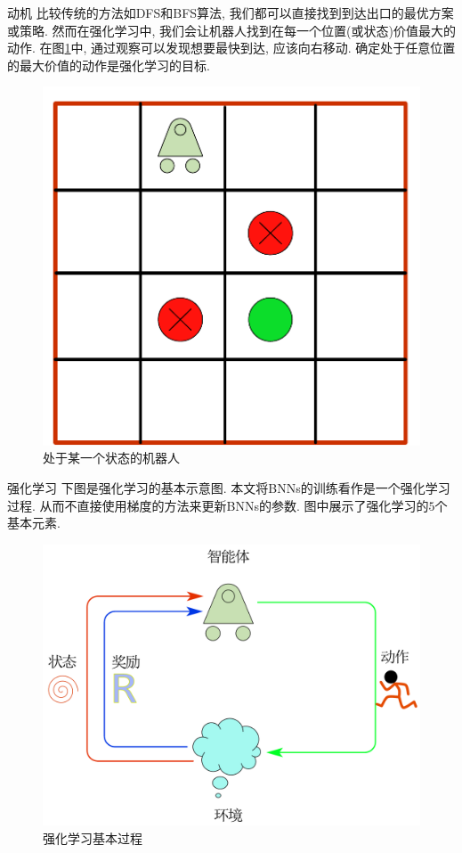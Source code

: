 \documentclass{beamer}
\begin{document}
\begin{frame}{动机}
    \footnotesize
    比较传统的方法如DFS和BFS算法, 我们都可以直接找到到达出口的最优方案或策略. 然而在强化学习中, 我们会让机器人找到在每一个位置(或状态)价值最大的动作. 在图\ref{fig:maze2}中, 通过观察可以发现想要最快到达, 应该向右移动. 确定处于任意位置的最大价值的动作是强化学习的目标.
    \begin{figure}
        \centering
        \includegraphics[scale=0.3]{pic/maze2.pdf}
        \caption{处于某一个状态的机器人}
        \label{fig:maze2}
    \end{figure}
\end{frame}

\begin{frame}{强化学习}
    \footnotesize
    下图是强化学习的基本示意图. 本文将BNNs的训练看作是一个强化学习过程. 从而不直接使用梯度的方法来更新BNNs的参数. 图中展示了强化学习的$5$个基本元素.
    \begin{figure}
        \centering
        \includegraphics[scale=0.3]{pic/rl.pdf}
        \caption{强化学习基本过程}
        \label{fig:RL}
    \end{figure}
\end{frame}
\end{document}
